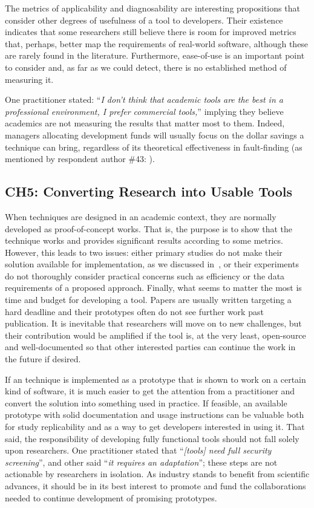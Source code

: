 The metrics of applicability and diagnosability  are interesting propositions that consider other degrees of usefulness of a tool to developers.
Their existence indicates that some researchers still believe there is room for improved metrics that, perhaps, better map the requirements of real-world software, although these are rarely found in the literature.
Furthermore, ease-of-use is an important point to consider and, as far as we could detect, there is no established method of measuring it.

One practitioner stated: ``\textit{I don't think that academic tools are the best in a professional environment, I prefer commercial tools,}'' implying they believe academics are not measuring the results that matter most to them.
Indeed, managers allocating development funds will usually focus on the dollar savings a technique can bring, regardless of its theoretical effectiveness in fault-finding (as mentioned by respondent author \#43: ).

\subsection{CH5: Converting Research into Usable Tools}
When techniques are designed in an academic context, they are normally developed as proof-of-concept works.
That is, the purpose is to show that the technique works and provides significant results according to some metrics.
However, this leads to two issues: either primary studies do not make their solution available for implementation, as we discussed in~, or their experiments do not thoroughly consider practical concerns such as efficiency or the data requirements of a proposed approach.
Finally, what seems to matter the most is time and budget for developing a tool.
Papers are usually written targeting a hard deadline and their prototypes often do not see further work past publication.
It is inevitable that researchers will move on to new challenges, but their contribution would be amplified if the tool is, at the very least, open-source and well-documented so that other interested parties can continue the work in the future if desired.

If an \rt technique is implemented as a prototype that is shown to work on a certain kind of software, it is much easier to get the attention from a practitioner and convert the solution into something used in practice.
If feasible, an available prototype with solid documentation and usage instructions can be valuable both for study replicability and as a way to get developers interested in using it.
That said, the responsibility of developing fully functional tools should not fall solely upon researchers.
One practitioner stated that ``\textit{[\rt tools] need full security screening}'', and other said ``\textit{it requires an adaptation}''; these steps are not actionable by researchers in isolation.
As industry stands to benefit from scientific advances, it should be in its best interest to promote and fund the collaborations needed to continue development of promising prototypes.

